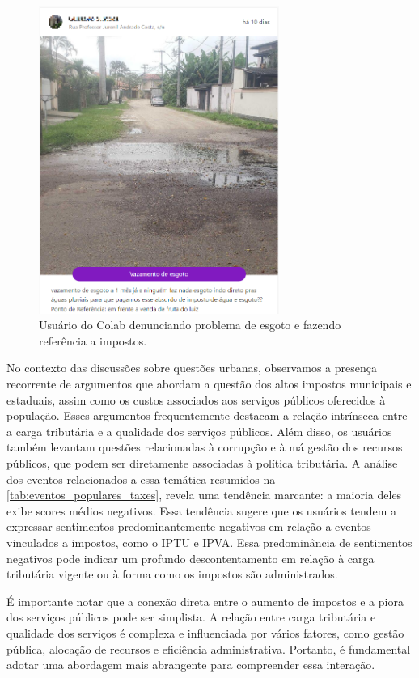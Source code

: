 \begin{figure}[htb]
	\centering
	\includegraphics[width=0.7\textwidth]{images/colab_posts_taxes.png}
	\caption{Usuário do Colab denunciando problema de esgoto e fazendo referência a impostos.}
	\label{fig:colab_posts_taxes}
\end{figure}

No contexto das discussões sobre questões urbanas, observamos a presença recorrente de argumentos que abordam a questão dos altos impostos municipais e estaduais, assim como os custos associados aos serviços públicos oferecidos à população. Esses argumentos frequentemente destacam a relação intrínseca entre a carga tributária e a qualidade dos serviços públicos. Além disso, os usuários também levantam questões relacionadas à corrupção e à má gestão dos recursos públicos, que podem ser diretamente associadas à política tributária. A análise dos eventos relacionados a essa temática resumidos na \autoref{tab:eventos_populares_taxes}, revela uma tendência marcante: a maioria deles exibe scores médios negativos. Essa tendência sugere que os usuários tendem a expressar sentimentos predominantemente negativos em relação a eventos vinculados a impostos, como o IPTU e IPVA. Essa predominância de sentimentos negativos pode indicar um profundo descontentamento em relação à carga tributária vigente ou à forma como os impostos são administrados.

É importante notar que a conexão direta entre o aumento de impostos e a piora dos serviços públicos pode ser simplista. A relação entre carga tributária e qualidade dos serviços é complexa e influenciada por vários fatores, como gestão pública, alocação de recursos e eficiência administrativa. Portanto, é fundamental adotar uma abordagem mais abrangente para compreender essa interação.

